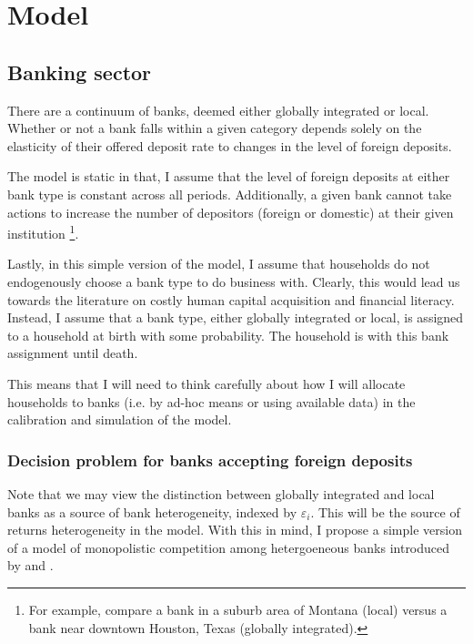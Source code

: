 \onlyinsubfile{\setcounter{section}{3}}
\section{Model}
\notinsubfile{\label{sec:Model}}

\subsection{Banking sector}

\par There are a continuum of banks, deemed either globally integrated or local. Whether or not a bank falls within a given category depends solely on the elasticity of their offered deposit rate to changes in the level of foreign deposits.

\par The model is static in that, I assume that the level of foreign deposits at either bank type is constant across all periods. Additionally, a given bank cannot take actions to increase the number of depositors (foreign or domestic) at their given institution \footnote{For example, compare a bank in a suburb area of Montana (local) versus a bank near downtown Houston, Texas (globally integrated).}.

\par Lastly, in this simple version of the model, I assume that households do not endogenously choose a bank type to do business with. Clearly, this would lead us towards the literature on costly human capital acquisition and financial literacy. Instead, I assume that a bank type, either globally integrated or local, is assigned to a household at birth with some probability. The household is  with this bank assignment until death.

\par This means that I will need to think carefully about how I will allocate households to banks (i.e. by ad-hoc means or using available data) in the calibration and simulation of the model.

\subsubsection{Decision problem for banks accepting foreign deposits}

\par Note that we may view the distinction between globally integrated and local banks as a source of bank heterogeneity, indexed by $\varepsilon_i$. This will be the source of returns heterogeneity in the model. With this in mind, I propose a simple version of a model of monopolistic competition among hetergoeneous banks introduced by \cite{Monti1972} and \cite{Klein1971}.

